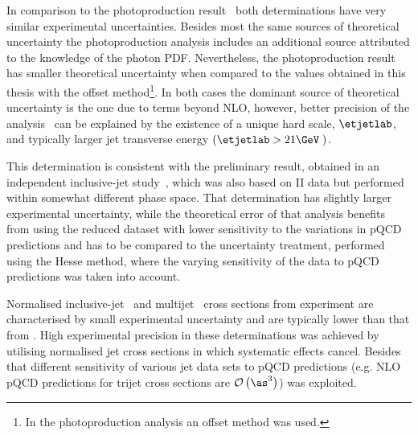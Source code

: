 In comparison to the photoproduction result~\cite{np:b864:1} both determinations have very similar experimental uncertainties. Besides most the same sources of theoretical uncertainty the photoproduction analysis includes an additional source attributed to the knowledge of the photon PDF. Nevertheless, the photoproduction result has smaller theoretical uncertainty when compared to the values obtained in this thesis with the offset method\footnote{In the photoproduction analysis an offset method was used.}. In both cases the dominant source of theoretical uncertainty is the one due to terms beyond NLO, however, better precision of the analysis~\cite{np:b864:1} can be explained by the existence of a unique hard scale, $\etjetlab$, and typically larger jet transverse energy $\left(\etjetlab > 21\GeV\;\right)$.

This \asz determination is consistent with the preliminary result, obtained in an independent inclusive-jet study~\cite{upub:zp10002}, which was also based on \hera II data but performed within somewhat different phase space. That determination has slightly larger experimental uncertainty, while the theoretical error of that analysis benefits from using the reduced dataset with lower sensitivity to the variations in pQCD predictions and has to be compared to the uncertainty treatment, performed using the Hesse method, where the varying sensitivity of the data to pQCD predictions was taken into account. 

Normalised inclusive-jet~\cite{epj:c65:363} and multijet~\cite{epj:c75:65} cross sections from \hone experiment are characterised by small experimental uncertainty and are typically lower than that from \zeus. High experimental precision in these determinations was achieved by utilising normalised jet cross sections in which systematic effects cancel. Besides that different sensitivity of various jet data sets to pQCD predictions (e.g. NLO pQCD predictions for trijet cross sections are $\mathcal{O}\left(\as^3\right)$) was exploited. %

